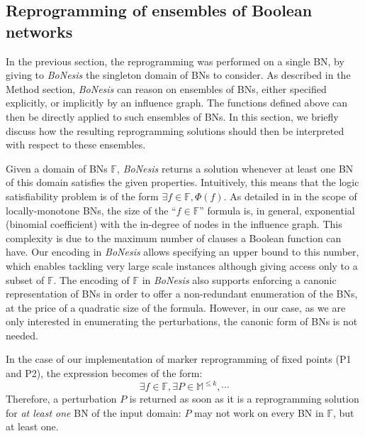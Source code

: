 \documentclass[PCJ,Unicode,screen,mode=plain]{cedram}
\begin{document}
\hypertarget{reprogramming-of-ensembles-of-boolean-networks}{%
\subsection{Reprogramming of ensembles of Boolean
networks}\label{reprogramming-of-ensembles-of-boolean-networks}}

In the previous section, the reprogramming was performed on a single BN,
by giving to \emph{BoNesis} the singleton domain of BNs to consider. As
described in the Method section, \emph{BoNesis} can reason on ensembles
of BNs, either specified explicitly, or implicitly by an influence
graph. The functions defined above can then be directly applied to such
ensembles of BNs. In this section, we briefly discuss how the resulting
reprogramming solutions should then be interpreted with respect to these
ensembles.

Given a domain of BNs \(\mathbb F\), \emph{BoNesis} returns a solution
whenever at least one BN of this domain satisfies the given properties.
Intuitively, this means that the logic satisfiability problem is of the
form \(\exists f\in \mathbb F, \Phi(f)\). As detailed in
\citep{bn-synthesis-ICTAI19} in the scope of locally-monotone BNs, the
size of the ``\(f\in\mathbb F\)'' formula is, in general, exponential
(binomial coefficient) with the in-degree of nodes in the influence
graph. This complexity is due to the maximum number of clauses a Boolean
function can have. Our encoding in \emph{BoNesis} allows specifying an
upper bound to this number, which enables tackling very large scale
instances although giving access only to a subset of \(\mathbb F\). The
encoding of \(\mathbb F\) in \emph{BoNesis} also supports enforcing a
canonic representation of BNs in order to offer a non-redundant
enumeration of the BNs, at the price of a quadratic size of the formula.
However, in our case, as we are only interested in enumerating the
perturbations, the canonic form of BNs is not needed.

In the case of our implementation of marker reprogramming of fixed
points (P1 and P2), the expression becomes of the form:
\[\exists f\in\mathbb F, \exists P\in\mathbb M^{\leq k}, \cdots\]
Therefore, a perturbation \(P\) is returned as soon as it is a
reprogramming solution for \emph{at least one} BN of the input domain:
\(P\) may not work on every BN in \(\mathbb F\), but at least one.
\end{document}
